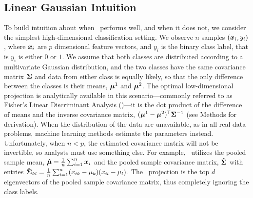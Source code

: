 \documentclass[10pt]{article}
\begin{document}

\subsection*{Linear Gaussian Intuition}

To build intuition about when \Lol~performs well, and when it does not,
we consider the simplest high-dimensional classification setting. 
We observe $n$ samples $(\boldsymbol{x}_i,y_i)$, where $\boldsymbol{x}_i$ are $p$ dimensional feature vectors, and $y_i$ is the binary class label, that is $y_i$ is either $0$ or $1$.
We assume that both classes are distributed according to a multivariate Gaussian distribution, and the two classes have the same covariance matrix $\boldsymbol{\Sigma}$ and data from either class is equally likely, so that the only difference between the classes is their means, $\boldsymbol{\mu}^1$ and $\boldsymbol{\mu}^2$.
%
The optimal low-dimensional projection is analytically available in this scenario---commonly referred to as Fisher's Linear Discriminant Analysis (\Lda)---it is the dot product of the difference of means and the inverse covariance matrix, $(\boldsymbol{\mu}^1-\boldsymbol{\mu}^2)^{\mathsf{T}} \boldsymbol{\Sigma}^{-1}$ \cite{Bickel2004a} (see Methods for derivation).
When the distribution of the data are unavailable, as in all real data problems, machine learning methods estimate the parameters instead.  
Unfortunately, when $n<p$, the estimated covariance matrix will not be invertible, so analysts must use something else.
For example, \Pca~utilizes the pooled sample mean, $\hat{\boldsymbol{\mu}}= \frac{1}{n} \sum_{i=1}^n \boldsymbol{x}_i$ and the pooled sample covariance matrix,  $\hat{\boldsymbol{\Sigma}}$ with entries $\hat{\boldsymbol{\Sigma}}_{kl}=\frac{1}{n} \sum_{i=1}^n (x_{ik} - \mu_k) (x_{il} - \mu_l)$.  
The \Pca~projection is the top $d$ eigenvectors of the pooled sample covariance matrix, thus completely ignoring the class labels.
\end{document}
